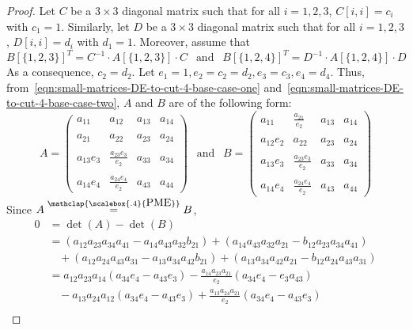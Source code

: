 \documentclass[11pt,letterpaper]{article}
\newcommand{\PME}{\stackrel{\mathclap{\scalebox{.4}{\mbox{PME}}}}{=}}
\begin{document}
{{{\begin{proof}
Let $C$ be a $3\times 3$ diagonal matrix such that for all $i=1,2,3$, $C[i,i]=c_i$ with $c_1=1$. Similarly, let $D$ be a $3\times 3$ diagonal matrix such that for all $i=1,2,3$, $D[i,i]=d_i$ with $d_1=1$. Moreover, assume that 
\begin{equation}
\label{eqn:small-matrices-DE-to-cut-4-base-case-two}
B[\{1,2,3\}]^T=C^{-1}\cdot A[\{1,2,3\}]\cdot C\ \ \text{ and }\ \ B[\{1,2,4\}]^T=D^{-1}\cdot A[\{1,2,4\}]\cdot D
\end{equation}
As a consequence, $c_2=d_2$. Let $e_1=1, e_2=c_2=d_2, e_3=c_3, e_4=d_4$. Thus, from~\cref{eqn:small-matrices-DE-to-cut-4-base-case-one} and~\cref{eqn:small-matrices-DE-to-cut-4-base-case-two}, $A$ and $B$ are of the following form:
\[
A=
\begin{pmatrix}
a_{11}     &  a_{12}                  & a_{13}    & a_{14}\\
&&&\\
a_{21}     &  a_{22}                  & a_{23}    & a_{24}\\
&&&\\
a_{13}e_3  &  \frac{a_{23}e_3}{e_2}   & a_{33}    & a_{34}\\
&&&\\
a_{14}e_4  &  \frac{a_{24}e_4}{e_2}   & a_{43}    & a_{44}
\end{pmatrix}
\ \ \text{ and }\ \ 
B=
\begin{pmatrix}
a_{11}     &  \frac{a_{21}}{e_2}      & a_{13}    & a_{14}\\
&&&\\
a_{12}e_2  &  a_{22}                  & a_{23}    & a_{24}\\
&&&\\
a_{13}e_3  &  \frac{a_{23}e_3}{e_2}   & a_{33}    & a_{34}\\
&&&\\
a_{14}e_4  &  \frac{a_{24}e_4}{e_2}   & a_{43}    & a_{44}
\end{pmatrix}
\]
Since $A\PME B$,
\begin{align*}
0 &= \det(A)-\det(B)\\
  &= (a_{12}a_{23}a_{34}a_{41}-a_{14}a_{43}a_{32}b_{21}) + (a_{14}a_{43}a_{32}a_{21}-b_{12}a_{23}a_{34}a_{41})\\
  &\ \ \ \ +(a_{12}a_{24}a_{43}a_{31}-a_{13}a_{34}a_{42}b_{21})+(a_{13}a_{34}a_{42}a_{21}-b_{12}a_{24}a_{43}a_{31})\\
  &= a_{12}a_{23}a_{14}(a_{34}e_4-a_{43}e_3)-\frac{a_{14}a_{23}a_{21}}{e_2}(a_{34}e_4-e_3a_{43})\\
  &\ \ \ \ -a_{13}a_{24}a_{12}(a_{34}e_4-a_{43}e_3)+\frac{a_{13}a_{24}a_{21}}{e_2}(a_{34}e_4-a_{43}e_3)\\

\end{align*}
\end{proof}}}}
\end{document}
